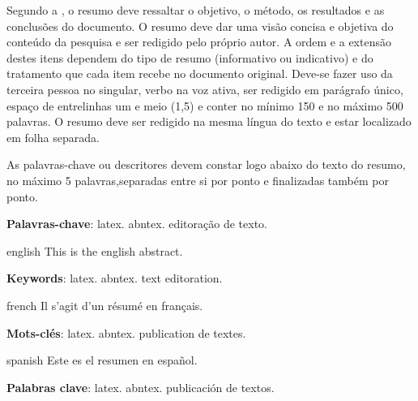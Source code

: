 \setlength{\absparsep}{18pt} %
\begin{resumo}
 Segundo a , o resumo deve ressaltar o objetivo, o método, os resultados e as conclusões do documento. O resumo deve dar uma visão concisa e objetiva do conteúdo da pesquisa e ser redigido pelo próprio autor. A ordem e a extensão destes itens dependem do tipo de resumo (informativo ou indicativo) e do tratamento que cada item recebe no documento original. Deve-se fazer uso da terceira pessoa no singular, verbo na voz ativa, ser redigido em parágrafo único, espaço de entrelinhas um e meio (1,5) e conter no mínimo 150 e no máximo 500 palavras. O resumo deve ser redigido na mesma língua do texto e estar localizado em folha separada.
 
As palavras-chave ou descritores devem constar logo abaixo do texto do resumo, no máximo 5 palavras,separadas entre si por ponto e finalizadas também por ponto. 

 \textbf{Palavras-chave}: latex. abntex. editoração de texto.
\end{resumo}

\begin{resumo}[Abstract]
 \begin{otherlanguage*}{english}
   This is the english abstract.

   \vspace{\onelineskip}
 
   \noindent 
   \textbf{Keywords}: latex. abntex. text editoration.
 \end{otherlanguage*}
\end{resumo}

\begin{resumo}[Résumé]
 \begin{otherlanguage*}{french}
    Il s'agit d'un résumé en français.
 
   \textbf{Mots-clés}: latex. abntex. publication de textes.
 \end{otherlanguage*}
\end{resumo}

\begin{resumo}[Resumen]
 \begin{otherlanguage*}{spanish}
   Este es el resumen en español.
  
   \textbf{Palabras clave}: latex. abntex. publicación de textos.
 \end{otherlanguage*}
\end{resumo}
